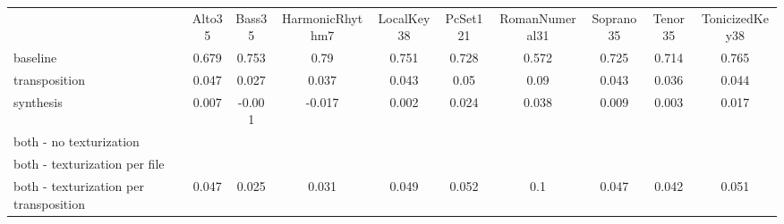 \begin{tabular}{lccccccccc}
                                        & Alto35 & Bass35 & HarmonicRhythm7 & LocalKey38 & PcSet121 & RomanNumeral31 & Soprano35 & Tenor35 & TonicizedKey38 \\
baseline                               & 0.679  & 0.753  & 0.79            & 0.751      & 0.728    & 0.572          & 0.725     & 0.714   & 0.765          \\
transposition                          & 0.047  & 0.027  & 0.037           & 0.043      & 0.05     & 0.09           & 0.043     & 0.036   & 0.044          \\
synthesis                              & 0.007  & -0.001 & -0.017          & 0.002      & 0.024    & 0.038          & 0.009     & 0.003   & 0.017          \\
both - no texturization                &        &        &                 &            &          &                &           &         &                \\
both - texturization per file          &        &        &                 &            &          &                &           &         &                \\
both - texturization per transposition & 0.047  & 0.025  & 0.031           & 0.049      & 0.052    & 0.1            & 0.047     & 0.042   & 0.051         
\end{tabular}
